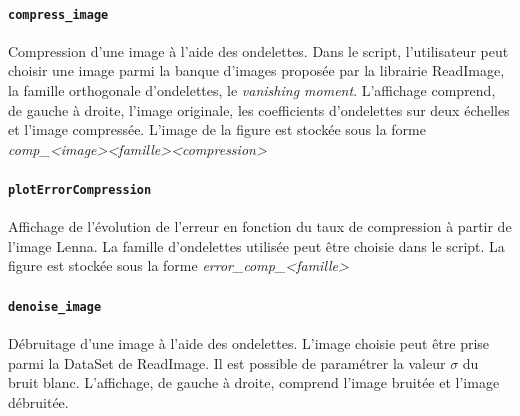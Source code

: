 \documentclass[a4paper,12pt, openany, twoside]{article}
\theoremstyle{break}
\begin{document}
\paragraph{\texttt{compress\_image}}
Compression d'une image à l'aide des ondelettes. Dans le script, l'utilisateur peut choisir une image parmi la banque d'images proposée par la librairie ReadImage, la famille orthogonale d'ondelettes, le \textit{vanishing moment}. L'affichage comprend, de gauche à droite, l'image originale, les coefficients d'ondelettes sur deux échelles et l'image compressée. L'image de la figure est stockée sous la forme  \textit{comp\_<image><famille><compression>}

\paragraph{\texttt{plotErrorCompression}}
Affichage de l'évolution de l'erreur en fonction du taux de compression à partir de l'image Lenna. La famille d'ondelettes utilisée peut être choisie dans le script. La figure est stockée sous la forme \textit{error\_comp\_<famille>}

\paragraph{\texttt{denoise\_image}}
Débruitage d'une image à l'aide des ondelettes. L'image choisie peut être prise parmi la DataSet de ReadImage. Il est possible de paramétrer la valeur $\sigma$ du bruit blanc. L'affichage, de gauche à droite, comprend l'image bruitée et l'image débruitée.
\end{document}
